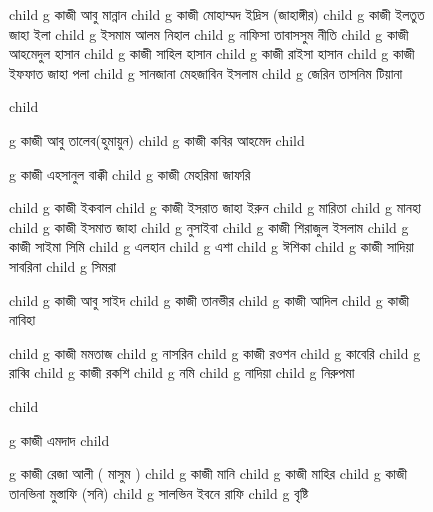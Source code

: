 \documentclass{article}
\begin{document}
\begin{figure}
{\begin{genealogypicture}
{{{{{{{            }
          }
          child{    g{ কাজী আবু মান্নান }   }
          child{    g{ কাজী মোহাম্মদ ইদ্রিস (জাহাঙ্গীর) }
                child{ g{ কাজী ইলতুত জাহা ইলা } 
                      child{ g{ ইসমাম আলম নিহাল  }  }
                      child{ g{ নাফিসা তাবাসসুম নীতি }  }
                 } 
                child{ g{ কাজী আহমেদুল হাসান } 
                    child{ g{ কাজী সাহিল হাসান }  }
                    child{ g{ কাজী রাইসা হাসান }  }
                 }
                 child{ g{ কাজী ইফফাত জাহা পলা }
                      child{ g{ সানজানা মেহজাবিন ইসলাম  }  }
                      child{ g{ জেরিন তাসনিম টিয়ানা }  }
                   }
            }
            
          
          child{   
            g{ কাজী আবু তালেব(হুমায়ুন)  }
              child{ g{ কাজী কবির আহমেদ  }  }
              child{ g{ কাজী এহসানুল বাক্কী }
                  child{ g{ কাজী মেহরিমা জাফরি }  }
                  
              }
          }
          child{    g{ কাজী ইকবাল } 
                child{ g{ কাজী ইসরাত জাহা ইরুন }
                  child{ g{ মারিতা }  }
                  child{ g{ মানহা }  }
                }
                child{ g{ কাজী ইসমাত জাহা } 
                child{ g{ নুসাইবা }  }
                }
            }
          child{    g{ কাজী শিরাজুল ইসলাম }  
              child{ g{ কাজী সাইমা সিমি } 
                  child{ g{ এলহান }  }
                  child{ g{ এশা }  }
                  child{ g{ ঈশিকা }  }
              }
              child{ g{ কাজী সাদিয়া সাবরিনা } 
                    child{ g{ সিমরা }  }
              }
           }
        
          child{    g{ কাজী আবু সাইদ }
                  child{ g{ কাজী তানভীর }
                      child{ g{ কাজী আদিল }  }
                      child{ g{ কাজী নাবিহা }  }
                    }
             }

             child{ g{ কাজী মমতাজ } 
             child{ g{ নাসরিন } }
             }
            child{ g{ কাজী রওশন } 
            child{ g{ কাবেরি  }  }
            child{ g{ রাব্বি }  }
            }
            child{ g{ কাজী রকশি } 
              child{ g{ নমি }  }
              child{ g{ নাদিয়া  }  }
              child{ g{ নিরুপমা }  }
            }
          }
          child{    g{ কাজী এমদাদ } 
              child{    g{ কাজী রেজা আলী ( মাসুম ) } 
                    child{    g{ কাজী মানি }
                        child{    g{ কাজী মাহির   }     }
                          }
                    child{    g{ কাজী তানভিনা মুস্তাফি (সনি)  } 
                    child{ g{ সালভিন ইবনে রাফি }  }
                      child{    g{ বৃষ্টি }  }  
                    }

}}}}}}
\end{genealogypicture}}
\end{figure}
\end{document}
